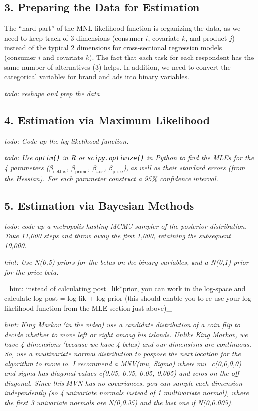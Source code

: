 \documentclass[
  letterpaper,
  DIV=11,
  numbers=noendperiod]{scrartcl}
\begin{document}
\subsection{3. Preparing the Data for
Estimation}\label{preparing-the-data-for-estimation}

The ``hard part'' of the MNL likelihood function is organizing the data,
as we need to keep track of 3 dimensions (consumer \(i\), covariate
\(k\), and product \(j\)) instead of the typical 2 dimensions for
cross-sectional regression models (consumer \(i\) and covariate \(k\)).
The fact that each task for each respondent has the same number of
alternatives (3) helps. In addition, we need to convert the categorical
variables for brand and ads into binary variables.

\emph{todo: reshape and prep the data}

\subsection{4. Estimation via Maximum
Likelihood}\label{estimation-via-maximum-likelihood}

\emph{todo: Code up the log-likelihood function.}

\emph{todo: Use \texttt{optim()} in R or \texttt{scipy.optimize()} in
Python to find the MLEs for the 4 parameters (\(\beta_\text{netflix}\),
\(\beta_\text{prime}\), \(\beta_\text{ads}\), \(\beta_\text{price}\)),
as well as their standard errors (from the Hessian). For each parameter
construct a 95\% confidence interval.}

\subsection{5. Estimation via Bayesian
Methods}\label{estimation-via-bayesian-methods}

\emph{todo: code up a metropolis-hasting MCMC sampler of the posterior
distribution. Take 11,000 steps and throw away the first 1,000,
retaining the subsequent 10,000.}

\emph{hint: Use N(0,5) priors for the betas on the binary variables, and
a N(0,1) prior for the price beta.}

\_hint: instead of calculating post=lik*prior, you can work in the
log-space and calculate log-post = log-lik + log-prior (this should
enable you to re-use your log-likelihood function from the MLE section
just above)\_

\emph{hint: King Markov (in the video) use a candidate distribution of a
coin flip to decide whether to move left or right among his islands.
Unlike King Markov, we have 4 dimensions (because we have 4 betas) and
our dimensions are continuous. So, use a multivariate normal
distribution to pospose the next location for the algorithm to move to.
I recommend a MNV(mu, Sigma) where mu=c(0,0,0,0) and sigma has diagonal
values c(0.05, 0.05, 0.05, 0.005) and zeros on the off-diagonal. Since
this MVN has no covariances, you can sample each dimension independently
(so 4 univariate normals instead of 1 multivariate normal), where the
first 3 univariate normals are N(0,0.05) and the last one if
N(0,0.005).}
\end{document}
